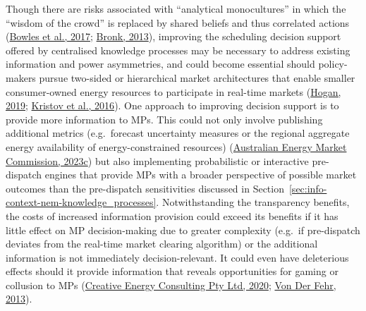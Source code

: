 \documentclass[12pt,a4paper,]{report}
\begin{document}
Though there are risks associated with ``analytical monocultures'' in
which the ``wisdom of the crowd'' is replaced by shared beliefs and thus
correlated actions
(\protect\hyperlink{ref-bowlesRetrospectivesFriedrichHayek2017}{Bowles
et al., 2017}; \protect\hyperlink{ref-bronkHayekWisdomPrices2013}{Bronk,
2013}), improving the scheduling decision support offered by centralised
knowledge processes may be necessary to address existing information and
power asymmetries, and could become essential should policy-makers
pursue two-sided or hierarchical market architectures that enable
smaller consumer-owned energy resources to participate in real-time
markets (\protect\hyperlink{ref-hoganMarketDesignPractices2019}{Hogan,
2019}; \protect\hyperlink{ref-kristovTaleTwoVisions2016}{Kristov et al.,
2016}). One approach to improving decision support is to provide more
information to MPs. This could not only involve publishing additional
metrics (e.g.~forecast uncertainty measures or the regional aggregate
energy availability of energy-constrained resources)
(\protect\hyperlink{ref-australianenergymarketcommissionOperatingReserveMarket2023}{Australian
Energy Market Commission, 2023c}) but also implementing probabilistic or
interactive pre-dispatch engines that provide MPs with a broader
perspective of possible market outcomes than the pre-dispatch
sensitivities discussed in
Section~\ref{sec:info-context-nem-knowledge_processes}. Notwithstanding
the transparency benefits, the costs of increased information provision
could exceed its benefits if it has little effect on MP decision-making
due to greater complexity (e.g.~if pre-dispatch deviates from the
real-time market clearing algorithm) or the additional information is
not immediately decision-relevant. It could even have deleterious
effects should it provide information that reveals opportunities for
gaming or collusion to MPs
(\protect\hyperlink{ref-creativeenergyconsultingptyltdSchedulingAheadMarkets2020}{Creative
Energy Consulting Pty Ltd, 2020};
\protect\hyperlink{ref-vonderfehrTransparencyElectricityMarkets2013}{Von
Der Fehr, 2013}).
\end{document}
